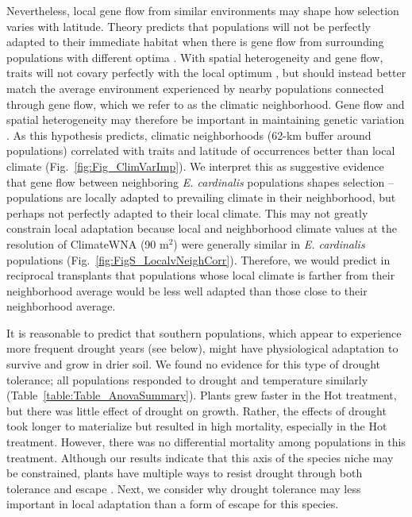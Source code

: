 \documentclass[11pt, oneside]{article}
\begin{document}
Nevertheless, local gene flow from similar environments may shape how selection varies with latitude. Theory predicts that populations will not be perfectly adapted to their immediate habitat when there is gene flow from surrounding populations with different optima \citep{Lenormand_2002}. With spatial heterogeneity and gene flow, traits will not covary perfectly with the local optimum \citep{Slatkin_1978, Paul_etal_2011, Hadfield_2016}, but should instead better match the average environment experienced by nearby populations connected through gene flow, which we refer to as the climatic neighborhood. Gene flow and spatial heterogeneity may therefore be important in maintaining genetic variation \citep{Yeaman_Jarvis_2006}. As this hypothesis predicts, climatic neighborhoods (62-km buffer around populations) correlated with traits and latitude of occurrences better than local climate (Fig.~\ref{fig:Fig_ClimVarImp}). We interpret this as suggestive evidence that gene flow between neighboring \textit{E. cardinalis} populations shapes selection -- populations are locally adapted to prevailing climate in their neighborhood, but perhaps not perfectly adapted to their local climate. This may not greatly constrain local adaptation because local and neighborhood climate values at the resolution of ClimateWNA (90 m$^2$) were generally similar in \textit{E. cardinalis} populations (Fig.~\ref{fig:FigS_LocalvNeighCorr}). Therefore, we would predict in reciprocal transplants that populations whose local climate is farther from their neighborhood average would be less well adapted than those close to their neighborhood average.

It is reasonable to predict that southern populations, which appear to experience more frequent drought years (see below), might have physiological adaptation to survive and grow in drier soil. We found no evidence for this type of drought tolerance; all populations responded to drought and temperature similarly (Table~\ref{table:Table_AnovaSummary}). Plants grew faster in the Hot treatment, but there was little effect of drought on growth. Rather, the effects of drought took longer to materialize but resulted in high mortality, especially in the Hot treatment. However, there was no differential mortality among populations in this treatment. Although our results indicate that this axis of the species niche may be constrained, plants have multiple ways to resist drought through both tolerance and escape \citep{Ludlow_1989, Kooyers_2015}. Next, we consider why drought tolerance may less important in local adaptation than a form of escape for this species.
\end{document}
